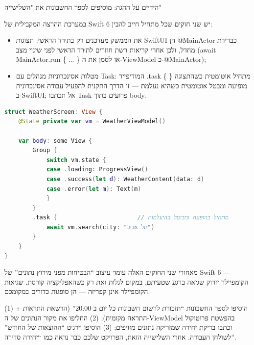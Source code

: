 \begin{tcbpractice}{הידיים על ההגה: מוסיפים לספר החשבונות את "השלישייה"}

במערכת ההרצה המקבילית של Swift 6 יש שני חוקים שכל מתחיל חייב להבין:

\begin{itemize}
  \item את הממשק מעדכנים רק בת׳רד הראשי: תצוגות SwiftUI הן @MainActor כברירת מחדל, ולכן אחרי קריאות רשת חוזרים לת׳רד הראשי לפני שינוי מצב (await MainActor.run \{ ... \} או לסמן את ה-ViewModel כ-@MainActor);
  \item מטלות אסינכרוניות מנהלים עם Task: המודיפייר .task \{ \} מתחיל אוטומטית כשהתצוגה מופיעה ומבטל אוטומטית כשהיא נעלמת — זו הדרך התקנית להפעיל עבודה אסינכרונית ב-SwiftUI; אל תכתבו Task פרועים בתוך body.
\end{itemize}

\begin{lstlisting}[language=Swift]
struct WeatherScreen: View {
    @State private var vm = WeatherViewModel()

    var body: some View {
        Group {
            switch vm.state {
            case .loading: ProgressView()
            case .success(let d): WeatherContent(data: d)
            case .error(let m): Text(m)
            }
        }
        .task {                       // מתחיל בהופעה ומבוטל בהיעלמות
            await vm.search(city: "תל אביב")
        }
    }
}
\end{lstlisting}

מאחורי שני החוקים האלה עומד עיצוב “הבטיחות מפני מירוץ נתונים” של Swift 6 — הקומפיילר יזרוק שגיאה ברגע שטעיתם, במקום לגלות זאת רק כשהאפליקציה קורסת. שגיאות הקומפיילר אינן קפריזה — הן סופגות כדורים במקומכם.

(1) הוסיפו לספר החשבונות “תזכורת לרשום חשבונות כל יום ב-20:00” (הרשאת התראות + התראה מקומית); (2) החליפו את מקור הנתונים של ה-ViewModel בהפשטת פרוטוקול וכתבו בדיקת יחידה שמזריקה נתונים מזויפים; (3) הוסיפו וידג׳ט “ההוצאות של החודש” לשולחן העבודה. אחרי השלישייה הזאת, הפרויקט שלכם כבר נראה כמו “יחידה סדירה”.

\end{tcbpractice}

